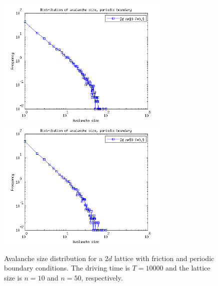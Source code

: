 \begin{figure} 
\begin{center}
\includegraphics[width=0.75\textwidth]{results/spf.png}
\includegraphics[width=0.75\textwidth]{results/spf50.png} \\
\caption{Avalanche size distribution for a $2d$ lattice with friction and periodic boundary conditions. The driving time is $T=10 000$ and the lattice size is $n=10$ and $n=50$, respectively. }
\label{spf1}
\end{center}
\end{figure}


